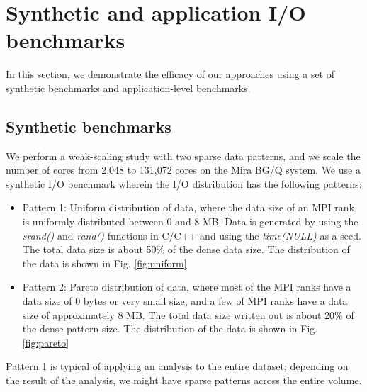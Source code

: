 \documentclass[final,5p,times]{elsarticle}
\begin{document}
\section{Synthetic and application I/O benchmarks}
\label{sec:appbenchmark}
In this section, we demonstrate the efficacy of our approaches using a set of synthetic benchmarks and application-level benchmarks.

\subsection{Synthetic benchmarks}
We perform a weak-scaling study with two sparse data patterns, and we scale the number of cores from 2,048 to 131,072 cores on the Mira BG/Q system. We use a synthetic I/O benchmark wherein the I/O distribution has the following patterns:

\begin{itemize}
\item Pattern 1: Uniform distribution of data, where the data size of an MPI rank is uniformly distributed between 0 and 8 MB.  Data is generated by using the \textit{srand()} and \textit{rand()} functions in C/C++ and using the \textit{time(NULL)} as a seed.  The total data size is about 50\% of the dense data size. The distribution of the data is shown in Fig. \ref{fig:uniform}
\item Pattern 2: Pareto distribution of data, where most of the MPI ranks have a data size of 0 bytes or very small size, and a few of MPI ranks have a data size of approximately 8 MB. The total data size written out is about 20\% of the dense pattern size. The distribution of the data is shown in Fig. \ref{fig:pareto}
\end{itemize}

Pattern 1
is typical of applying an analysis to the entire dataset; depending on the result of the analysis, we might have sparse patterns across the entire volume.
\end{document}
